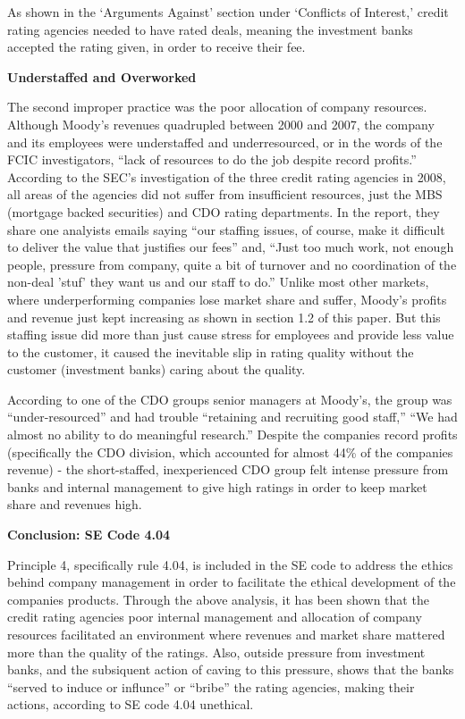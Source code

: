 \documentclass[11pt]{article}
\begin{document}
\begin{multicols}{2}
As shown in the `Arguments Against' section under `Conflicts of Interest,' credit rating agencies needed to have rated deals, meaning the investment banks accepted the rating given, in order to receive their fee. \cite[p.210]{govtReport} 

\textbf{Understaffed and Overworked}

The second improper practice was the poor allocation of company resources.  Although Moody's revenues quadrupled between 2000 and 2007, the company and its employees were understaffed and underresourced, or in the words of the FCIC investigators, ``lack of resources to do the job despite record profits.'' \cite[p.xxv]{govtReport}  According to the SEC's investigation of the three credit rating agencies in 2008, all areas of the agencies did not suffer from insufficient resources, just the MBS (mortgage backed securities) and CDO rating departments. \cite{secCRAreport}  In the report, they share one analyists emails saying ``our staffing issues, of course, make it difficult to deliver the value that justifies our fees'' and, ``Just too much work, not enough people, pressure from company, quite a bit of turnover and no coordination of the non-deal 'stuf' they want us and our staff to do.'' \cite{secCRAreport}  Unlike most other markets, where underperforming companies lose market share and suffer, Moody's profits and revenue just kept increasing as shown in section 1.2 of this paper.  But this staffing issue did more than just cause stress for employees and provide less value to the customer, it caused the inevitable slip in rating quality without the customer (investment banks) caring about the quality.   

According to one of the CDO groups senior managers at Moody's, the group was ``under-resourced'' and had trouble ``retaining and recruiting good staff,''  ``We had almost no ability to do meaningful research.'' \cite[p.149]{govtReport}  Despite the companies record profits (specifically the CDO division, which accounted for almost 44\% of the companies revenue) - the short-staffed, inexperienced CDO group felt intense pressure from banks and internal management to give high ratings in order to keep market share and revenues high. \cite[p.149-150]{govtReport}

\textbf{Conclusion: SE Code 4.04}

Principle 4, specifically rule 4.04, is included in the SE code to address the ethics behind company management in order to facilitate the ethical development of the companies products.  Through the above analysis, it has been shown that the credit rating agencies poor internal management and allocation of company resources facilitated an environment where revenues and market share mattered more than the quality of the ratings.  Also, outside pressure from investment banks, and the subsiquent action of caving to this pressure, shows that the banks ``served to induce or influnce'' or ``bribe'' the rating agencies, making their actions, according to SE code 4.04 unethical.


\end{multicols}
\end{document}
